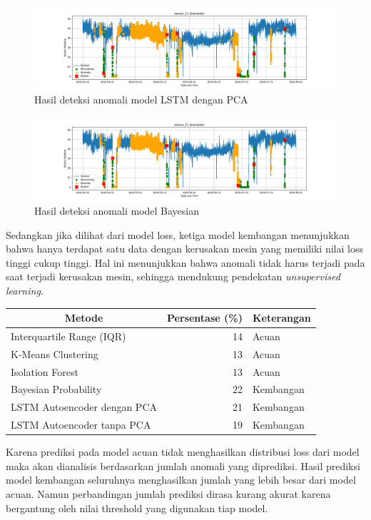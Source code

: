     \begin{figure}[h]
        \centerline{\includegraphics[width=1.4\textwidth]{resources/LSTM/LSTM_PCA_sensor_11.png}}
        \caption{Hasil deteksi anomali model LSTM dengan PCA}
    \end{figure}
    
    \begin{figure}[h]
        \centerline{\includegraphics[width=1.4\textwidth]{resources/Bayes/Bayes_sensor_11.png}}
        \caption{Hasil deteksi anomali model Bayesian}
    \end{figure}

    Sedangkan jika dilihat dari model loss, ketiga model kembangan menunjukkan bahwa hanya terdapat satu data dengan kerusakan mesin yang memiliki nilai loss tinggi cukup tinggi. Hal ini menunjukkan bahwa anomali tidak harus terjadi pada saat terjadi kerusakan mesin, sehingga mendukung pendekatan \textit{unsupervised learning}.

    \begin{table}[]
        \centering
        \begin{tabular}{|l|r|l|}
            \hline
            \multicolumn{1}{|c|}{\textbf{Metode}} & \multicolumn{1}{c|}{\textbf{Persentase (\%)}} & \multicolumn{1}{c|}{\textbf{Keterangan}} \\ \hline
            Interquartile Range (IQR)   & 14 & Acuan     \\ \hline
            K-Means Clustering          & 13 & Acuan     \\ \hline
            Isolation Forest            & 13 & Acuan     \\ \hline
            Bayesian Probability        & 22 & Kembangan \\ \hline
            LSTM Autoencoder dengan PCA & 21 & Kembangan \\ \hline
            LSTM Autoencoder tanpa PCA  & 19 & Kembangan \\ \hline
        \end{tabular}
    \end{table}

    Karena prediksi pada model acuan tidak menghasilkan distribusi loss dari model maka akan dianalisis berdasarkan jumlah anomali yang diprediksi. Hasil prediksi model kembangan seluruhnya menghasilkan jumlah yang lebih besar dari model acuan. Namun perbandingan jumlah prediksi dirasa kurang akurat karena bergantung oleh nilai threshold yang digunakan tiap model.
